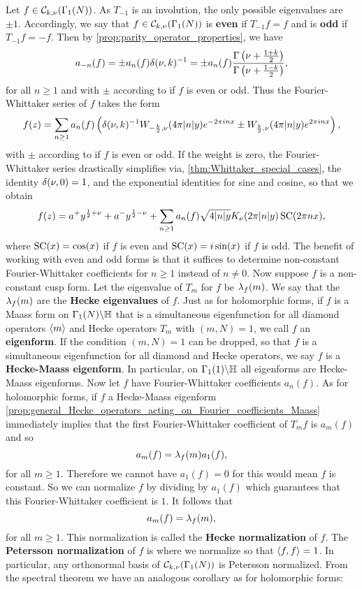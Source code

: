     Let $f \in \mathcal{C}_{k,\nu}(\Gamma_{1}(N))$. As $T_{-1}$ is an involution, the only possible eigenvalues are $\pm 1$. Accordingly, we say that $f \in \mathcal{C}_{k,\nu}(\Gamma_{1}(N))$ is \textbf{even} if $T_{-1}f = f$ and is \textbf{odd} if $T_{-1}f = -f$. Then by \cref{prop:parity_operator_properties}, we have
    \[
      a_{-n}(f) = \pm a_{n}(f)\delta(\nu,k)^{-1} = \pm a_{n}(f)\frac{\Gamma\left(\nu+\frac{1+k}{2}\right)}{\Gamma\left(\nu+\frac{1-k}{2}\right)},
    \]
    for all $n \ge 1$ and with $\pm$ according to if $f$ is even or odd. Thus the Fourier-Whittaker series of $f$ takes the form
    \[
      f(z) = \sum_{n \ge 1}a_{n}(f)\left(\delta(\nu,k)^{-1}W_{-\frac{k}{2},\nu}(4\pi |n|y)e^{-2\pi inx}\pm W_{\frac{k}{2},\nu}(4\pi |n|y)e^{2\pi inx}\right),
    \]
    with $\pm$ according to if $f$ is even or odd. If the weight is zero, the Fourier-Whittaker series drastically simplifies via, \cref{thm:Whittaker_special_cases}, the identity $\delta(\nu,0) = 1$, and the exponential identities for sine and cosine, so that we obtain
    \[
      f(z) = a^{+}y^{\frac{1}{2}+\nu}+a^{-}y^{\frac{1}{2}-\nu}+\sum_{n \ge 1}a_{n}(f)\sqrt{4|n|y}K_{\nu}(2\pi |n|y)\operatorname{\mathrm{SC}}(2\pi nx),
    \]
    where $\operatorname{\mathrm{SC}}(x) = \cos(x)$ if $f$ is even and $\operatorname{\mathrm{SC}}(x) = i\sin(x)$ if $f$ is odd. The benefit of working with even and odd forms is that it suffices to determine non-constant Fourier-Whittaker coefficients for $n \ge 1$ instead of $n \neq 0$. Now suppose $f$ is a non-constant cusp form. Let the eigenvalue of $T_{m}$ for $f$ be $\lambda_{f}(m)$. We say that the $\lambda_{f}(m)$ are the \textbf{Hecke eigenvalues} of $f$. Just as for holomorphic forms, if $f$ is a Maass form on $\Gamma_{1}(N)\backslash\mathbb{H}$ that is a simultaneous eigenfunction for all diamond operators $\langle m\rangle$ and Hecke operators $T_{m}$ with $(m,N) = 1$, we call $f$ an \textbf{eigenform}. If the condition $(m,N) = 1$ can be dropped, so that $f$ is a simultaneous eigenfunction for all diamond and Hecke operators, we say $f$ is a \textbf{Hecke-Maass eigenform}. In particular, on $\Gamma_{1}(1)\backslash\mathbb{H}$ all eigenforms are Hecke-Maass eigenforms. Now let $f$ have Fourier-Whittaker coefficients $a_{n}(f)$. As for holomorphic forms, if $f$ a Hecke-Maass eigenform \cref{prop:general_Hecke_operators_acting_on_Fourier_coefficients_Maass} immediately implies that the first Fourier-Whittaker coefficient of $T_{m}f$ is $a_{m}(f)$ and so
    \[
      a_{m}(f) = \lambda_{f}(m)a_{1}(f),
    \]
    for all $m \ge 1$. Therefore we cannot have $a_{1}(f) = 0$ for this would mean $f$ is constant. So we can normalize $f$ by dividing by $a_{1}(f)$ which guarantees that this Fourier-Whittaker coefficient is $1$. It follows that
    \[
      a_{m}(f) = \lambda_{f}(m),
    \]
    for all $m \ge 1$. This normalization is called the \textbf{Hecke normalization} of $f$. The \textbf{Petersson normalization} of $f$ is where we normalize so that $\langle f,f\rangle = 1$. In particular, any orthonormal basis of $\mathcal{C}_{k,\nu}(\Gamma_{1}(N))$ is Petersson normalized. From the spectral theorem we have an analogous corollary as for holomorphic forms:

